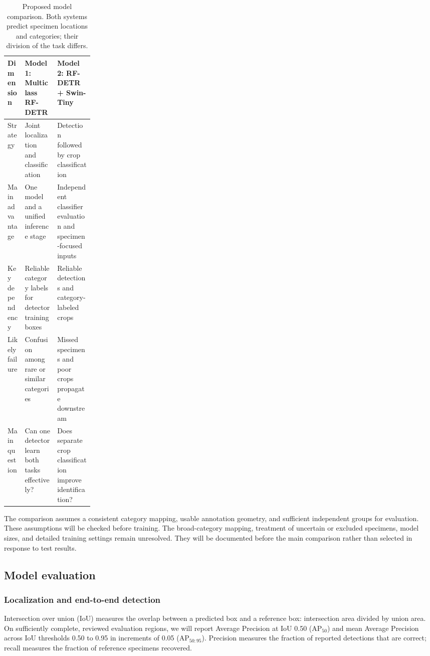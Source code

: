 \documentclass[11pt,letterpaper]{article}
\begin{document}
\begin{table}[htbp]
\centering
\caption{Proposed model comparison. Both systems predict specimen locations and categories; their division of the task differs.}
\label{tab:models}
\begin{tabularx}{\linewidth}{p{0.20\linewidth}YY}
\toprule
Dimension & Model 1: Multiclass RF-DETR & Model 2: RF-DETR + Swin-Tiny \\
\midrule
Strategy & Joint localization and classification & Detection followed by crop classification \\
Main advantage & One model and a unified inference stage & Independent classifier evaluation and specimen-focused inputs \\
Key dependency & Reliable category labels for detector training boxes & Reliable detections and category-labeled crops \\
Likely failure & Confusion among rare or similar categories & Missed specimens and poor crops propagate downstream \\
Main question & Can one detector learn both tasks effectively? & Does separate crop classification improve identification? \\
\bottomrule
\end{tabularx}
\end{table}

The comparison assumes a consistent category mapping, usable annotation geometry, and sufficient independent groups for evaluation. These assumptions will be checked before training. The broad-category mapping, treatment of uncertain or excluded specimens, model sizes, and detailed training settings remain unresolved. They will be documented before the main comparison rather than selected in response to test results.

\subsection{Model evaluation}
\subsubsection{Localization and end-to-end detection}
Intersection over union (IoU) measures the overlap between a predicted box and a reference box: intersection area divided by union area. On sufficiently complete, reviewed evaluation regions, we will report Average Precision at IoU 0.50 ($\mathrm{AP}_{50}$) and mean Average Precision across IoU thresholds 0.50 to 0.95 in increments of 0.05 ($\mathrm{AP}_{50:95}$). Precision measures the fraction of reported detections that are correct; recall measures the fraction of reference specimens recovered.
\end{document}
